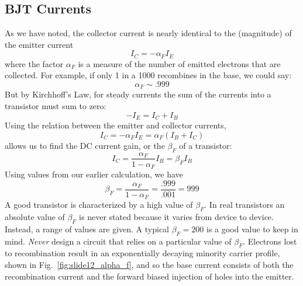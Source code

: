\subsection{BJT Currents}
As we have noted, the collector current is nearly identical to the (magnitude) of the emitter current 
    \begin{equation}
        {I_C} =  - {\alpha_F}{I_E}
    \end{equation}
where the factor $\alpha_F$  is a measure of the number of emitted electrons that are collected.  For example, if only 1 in a 1000 recombines in the base, we could say:
    \begin{equation}
        {\alpha _F} \sim .999
    \end{equation}
But by Kirchhoff's Law, for steady currents the sum of the currents into a transistor must sum to zero:
    \begin{equation} 
        - {I_E} = {I_C} + {I_B}
    \end{equation}
Using the relation between the emitter and collector currents,
    \begin{equation}
        {I_C} =  - {\alpha _F}{I_E} = {\alpha _F}({I_B} + {I_C})
    \end{equation}
allows us to find the DC current gain, or the $\beta_F$ of a transistor:
    \begin{equation}
        {I_C} = \frac{{{\alpha _F}}}{{1 - {\alpha _F}}}{I_B} = {\beta _F}{I_B}
    \end{equation}
Using values from our earlier calculation, we have
    \begin{equation}
        {\beta _F} = \frac{{{\alpha _F}}}{{1 - {\alpha _F}}} = \frac{{.999}}{{.001}} = 999
    \end{equation}
A good transistor is characterized by a high value of $\beta_F$.  In real transistors an absolute value of $\beta_F$ is never stated because it varies from device to device.  Instead, a range of values are given.  A typical $\beta_F =200$ is a good value to keep in mind. \emph{Never} design a circuit that relies on a particular value of $\beta_F$.  
Electrons lost to recombination result in an exponentially decaying minority carrier profile, shown in Fig.~\ref{fig:slide12_alpha_f}, and so the base current consists of both the recombination current and the forward biased  injection of holes into the emitter. 
